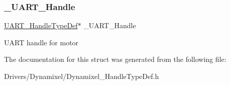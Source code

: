 \subsubsection{\texorpdfstring{\+\_\+\+U\+A\+R\+T\+\_\+\+Handle}{\_UART\_Handle}}
{\footnotesize\ttfamily \mbox{\hyperlink{struct_u_a_r_t___handle_type_def}{U\+A\+R\+T\+\_\+\+Handle\+Type\+Def}}$\ast$ \+\_\+\+U\+A\+R\+T\+\_\+\+Handle}

U\+A\+RT handle for motor 

The documentation for this struct was generated from the following file\+:\begin{DoxyCompactItemize}
\item 
Drivers/\+Dynamixel/Dynamixel\+\_\+\+Handle\+Type\+Def.\+h\end{DoxyCompactItemize}
